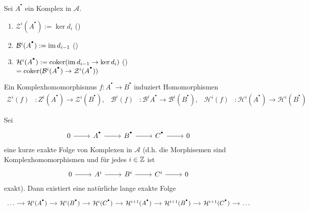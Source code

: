 \begin{df}\label{7.3}
	Sei $A^{^\bullet}$ ein Komplex in $\mathcal{A}$.
	\begin{enumerate}
		\item[] $\mathcal{Z}^i(A^{^\bullet}):= \ker d_i$ \hfill ()
		\item[] $\mathcal{B}^i(A^{^\bullet}) := \operatorname{im} d_{i-1}$ \hfill ()
		\item[] $\mathcal{H}^i(A^{^\bullet}) := \operatorname{coker} (\operatorname{im} d_{i-1} \to \ker d_i)$ \hfill ()\\
	\noindent\hspace*{14mm}	$ = \operatorname{coker}(\mathcal{B}^i(A^{^\bullet}) \to \mathcal{Z}^i(A^{^\bullet}))$
	\end{enumerate}
\end{df}
\begin{anm} 
	Ein Komplexhomomorphismus $f:A^{^\bullet} \to B^{^\bullet}$ induziert Homomorphismen
	 \begin{align*}
	\mathcal{Z}^i(f)&: Z^i(A^{^\bullet}) \to \mathcal{Z}^i(B^{^\bullet}),& \mathcal{B}^i(f)&: \mathcal{B}^iA^{^\bullet} \to \mathcal{B}^i (B^{^\bullet}),& \mathcal{H}^i(f)&: \mathcal{H}^i(A^{^\bullet}) \to \mathcal{H}^i(B^{^\bullet})
	\end{align*}
\end{anm}
\begin{sa}\label{7.4}
	Sei $$\begin{tikzcd}
	0 \arrow{r} & A^{^\bullet} \arrow{r} & B^{^\bullet} \arrow{r} & C^{^\bullet} \arrow{r} & 0
	\end{tikzcd}$$
	eine kurze exakte Folge von Komplexen in $\mathcal{A}$ (d.h. die Morphisemen sind Komplexhomomorphismen und für jedes $i\in \mathbb{Z}$ ist 
	$$\begin{tikzcd}
	0 \arrow{r} & A^i \arrow{r} & B^i \arrow{r} & C^i \arrow{r} & 0
	\end{tikzcd}$$
	exakt). Dann existiert eine natürliche lange exakte Folge 
	$$\begin{tikzcd}[column sep = small]
	\ldots \arrow{r} & \mathcal{H}^i(A^{^\bullet}) \arrow{r} & \mathcal{H}^i(B^{^\bullet}) \arrow{r} & \mathcal{H}^i(C^{^\bullet}) \arrow{r} & \mathcal{H}^{i+1}(A^{^\bullet}) \arrow{r}& \mathcal{H}^{i+1}(B^{^\bullet}) \arrow{r} & \mathcal{H}^{i+1}(C^{^\bullet}) \arrow{r}& \ldots
	\end{tikzcd}$$
\end{sa}
